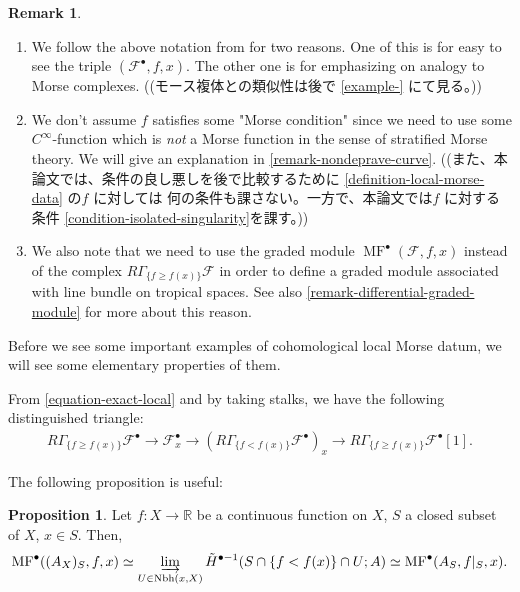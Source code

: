 \documentclass[a4paper,dvipdfmx,reqno,12pt]{amsart}
\theoremstyle{definition}
\newtheorem{proposition}[theorem]{Proposition}
\newtheorem{remark}[theorem]{Remark}
\newcommand{\mcal}[1]{\mathcal{#1}}%
\newcommand{\opn}[1]{\operatorname{#1}}
\numberwithin{equation}{section}
\begin{document}
\begin{remark}
\begin{enumerate}
\item We follow the above notation from 
\cite[p.271]{MR2031639} for two reasons.
One of this is for easy to see the triple 
$(\mcal{F}^{\bullet},f,x)$. 
The other one is for emphasizing on analogy to
Morse complexes.
((モース複体との類似性は後で \cref{example-} にて見る。))
\item We don't assume $f$ satisfies some 
"Morse condition" since
 we need to use some $C^{\infty}$-function
which is \emph{not} a Morse function in the sense of 
stratified Morse theory. 
We will give an explanation in 
\cref{remark-nondeprave-curve}.
((また、本論文では、条件の良し悪しを後で比較するために
\cref{definition-local-morse-data} の$f$ に対しては
何の条件も課さない。一方で、本論文では$f$ に対する
条件 \cref{condition-isolated-singularity}を課す。))
\item We also note that we need to use 
the graded module $\opn{MF}^{\bullet}(\mcal{F},f,x)$ instead of 
the complex $R\Gamma_{\{f\geq f(x)\}}\mathcal{F}$ in order to define
a graded module associated with line bundle on tropical
spaces. See also \cref{remark-differential-graded-module} for more about 
this reason.
\end{enumerate}
\end{remark}

Before we see some important examples of cohomological
local Morse datum, we will see some elementary
properties of them.

From \cref{equation-exact-local} and by taking stalks,
we have the following distinguished triangle:
\begin{align}
R\Gamma_{\{f\geq f(x)\}}\mathcal{F}^{\bullet} \to 
\mathcal{F}_x^{\bullet}\to 
(R\Gamma_{\{f<f(x)\}}\mathcal{F}^{\bullet})_x\to 
R\Gamma_{\{f\geq f(x)\}}\mathcal{F}^{\bullet}[1].
\end{align}



The following proposition is useful:

\begin{proposition} \label{prop-local-morse-data}
Let $f\colon X\to \mathbb{R}$ be a continuous function
on $X$, $S$ a closed subset
of $X$, $x\in S$. Then,
\begin{align} 
\opn{MF}^{\bullet}((A_{X})_S,f,x
) \simeq \varinjlim_{U\in\opn{Nbh}(x,X)} 
\tilde{H}^{\bullet-1}(S\cap \{f<f(x)\}\cap U;A) 
\simeq \opn{MF}^{\bullet}(A_S,f|_S,x).
\end{align}

\end{proposition}
\end{document}
